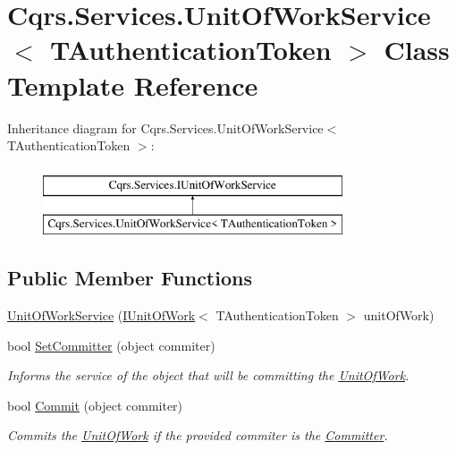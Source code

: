 \hypertarget{classCqrs_1_1Services_1_1UnitOfWorkService}{}\section{Cqrs.\+Services.\+Unit\+Of\+Work\+Service$<$ T\+Authentication\+Token $>$ Class Template Reference}
\label{classCqrs_1_1Services_1_1UnitOfWorkService}
Inheritance diagram for Cqrs.\+Services.\+Unit\+Of\+Work\+Service$<$ T\+Authentication\+Token $>$\+:\begin{figure}[H]
\begin{center}
\leavevmode
\includegraphics[height=2.000000cm]{classCqrs_1_1Services_1_1UnitOfWorkService}
\end{center}
\end{figure}
\subsection*{Public Member Functions}
\begin{DoxyCompactItemize}
\item 
\hyperlink{classCqrs_1_1Services_1_1UnitOfWorkService_a187b3f612490a8316770bb7c6a9aa25f_a187b3f612490a8316770bb7c6a9aa25f}{Unit\+Of\+Work\+Service} (\hyperlink{interfaceCqrs_1_1Domain_1_1IUnitOfWork}{I\+Unit\+Of\+Work}$<$ T\+Authentication\+Token $>$ unit\+Of\+Work)
\item 
bool \hyperlink{classCqrs_1_1Services_1_1UnitOfWorkService_a663471bc62f79df22c800ad683a27f59_a663471bc62f79df22c800ad683a27f59}{Set\+Committer} (object commiter)
\begin{DoxyCompactList}\small\item\em Informs the service of the object that will be committing the \hyperlink{classCqrs_1_1Services_1_1UnitOfWorkService_a1ba76512e37e5006c2b65d071803e99f_a1ba76512e37e5006c2b65d071803e99f}{Unit\+Of\+Work}. \end{DoxyCompactList}\item 
bool \hyperlink{classCqrs_1_1Services_1_1UnitOfWorkService_a3291740821150ecea174820ed27ee56c_a3291740821150ecea174820ed27ee56c}{Commit} (object commiter)
\begin{DoxyCompactList}\small\item\em Commits the \hyperlink{classCqrs_1_1Services_1_1UnitOfWorkService_a1ba76512e37e5006c2b65d071803e99f_a1ba76512e37e5006c2b65d071803e99f}{Unit\+Of\+Work} if the provided {\itshape commiter}  is the \hyperlink{classCqrs_1_1Services_1_1UnitOfWorkService_aabeccb6ba949fe02b8676b324f85950b_aabeccb6ba949fe02b8676b324f85950b}{Committer}. \end{DoxyCompactList}\end{DoxyCompactItemize}
